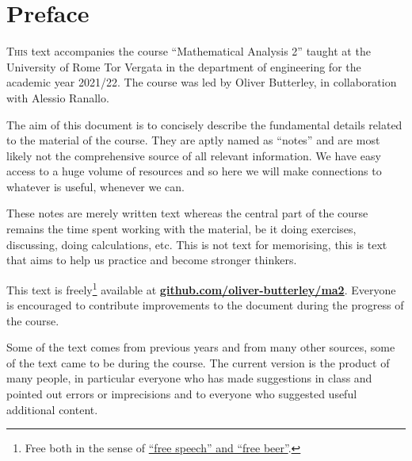\chapter{Preface}
\lettrine{T}{his} text accompanies the course ``Mathematical Analysis 2'' taught at the University of Rome Tor Vergata in the department of engineering for the academic year 2021/22.
The course was led by Oliver Butterley, in collaboration with Alessio Ranallo. 

The aim of this document is to concisely describe the fundamental details related to the material of the course.
They are aptly named as ``notes'' and are most likely not the comprehensive source of all relevant information.
We have easy access to a huge volume of resources and so here we will make connections to whatever is useful, whenever we can. 

These notes are merely written text whereas the central part of the course remains the time spent working with the material, be it doing exercises, discussing, doing calculations, etc. This is not text for memorising, this is text that aims to help us practice and become stronger thinkers.

This text is freely\footnote{Free both in the sense of \href{https://en.wikipedia.org/wiki/Gratis_versus_libre}{``free speech'' and ``free beer''}.} available at \href{https://github.com/oliver-butterley/ma2}{\textbf{github.com/oliver-butterley/ma2}}.
Everyone is encouraged to contribute improvements to the document during the progress of the course. 

Some of the text comes from previous years and from many other sources, some of the text came to be during the course.
The current version is the product of many people, in particular everyone who has made suggestions in class and pointed out errors or imprecisions and to everyone who suggested useful additional content.


